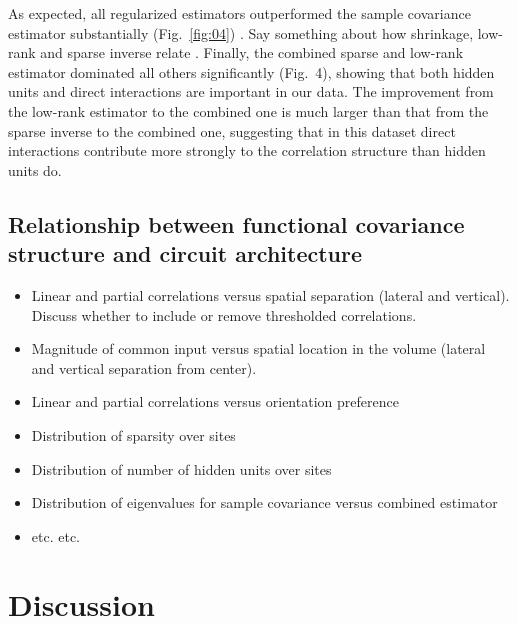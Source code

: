 \documentclass[10pt]{article}
\newcommand{\Acomment}[1]{{\color{red}{[AE: #1]}}}
\begin{document}
As expected, all regularized estimators outperformed the sample covariance estimator substantially (Fig.~\ref{fig:04}) \Acomment{I think we should show that}. Say something about how shrinkage, low-rank and sparse inverse relate \Acomment{Why do we do pairwise comparisons instead of just showing median (across sites) log loss relative to the combined estimator? I've seen many people do this and it provides an ordering. I feel like we should come up with a way of ordering them somehow, even if it's under certain assumptions that may not be entirely correct. I'm pretty sure if we don't do it the reviewers will bring it up anyway...}. Finally, the combined sparse and low-rank estimator dominated all others significantly (Fig.~4), showing that both hidden units and direct interactions are important in our data. The improvement from the low-rank estimator to the combined one is much larger than that from the sparse inverse to the combined one, suggesting that in this dataset direct interactions contribute more strongly to the correlation structure than hidden units do.



\subsection*{Relationship between functional covariance structure and circuit architecture}

\begin{itemize}
\item Linear and partial correlations versus spatial separation (lateral and vertical). Discuss whether to include or remove thresholded correlations.
\item Magnitude of common input versus spatial location in the volume (lateral and vertical separation from center).
\item Linear and partial correlations versus orientation preference
\item Distribution of sparsity over sites
\item Distribution of number of hidden units over sites
\item Distribution of eigenvalues for sample covariance versus combined estimator
\item etc. etc. 

\end{itemize}







\section*{Discussion}
\end{document}
